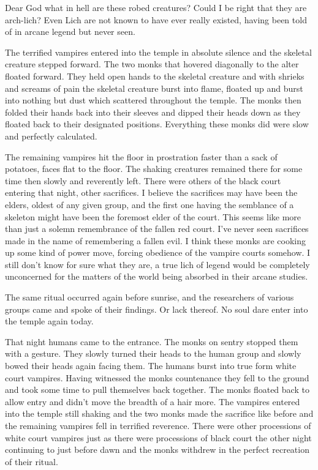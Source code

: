 Dear God what in hell are these robed creatures? Could I be right that they are arch-lich? Even Lich are not known to have ever really existed, having been told of in arcane legend but never seen.

The terrified vampires entered into the temple in absolute silence and the skeletal creature stepped forward. The two monks that hovered diagonally to the alter floated forward. They held open hands to the skeletal creature and with shrieks and screams of pain the skeletal creature burst into flame, floated up and burst into nothing but dust which scattered throughout the temple. The monks then folded their hands back into their sleeves and dipped their heads down as they floated back to their designated positions. Everything these monks did were slow and perfectly calculated.

The remaining vampires hit the floor in prostration faster than a sack of potatoes, faces flat to the floor. The shaking creatures remained there for some time then slowly and reverently left. There were others of the black court entering that night, other sacrifices. I believe the sacrifices may have been the elders, oldest of any given group, and the first one having the semblance of a skeleton might have been the foremost elder of the court. This seems like more than just a solemn remembrance of the fallen red court. I've never seen sacrifices made in the name of remembering a fallen evil. I think these monks are cooking up some kind of power move, forcing obedience of the vampire courts somehow. I still don't know for sure what they are, a true lich of legend would be completely unconcerned for the matters of the world being absorbed in their arcane studies.


The same ritual occurred again before sunrise, and the researchers of various groups came and spoke of their findings. Or lack thereof. No soul dare enter into the temple again today. 


That night humans came to the entrance. The monks on sentry stopped them with a gesture. They slowly turned their heads to the human group and slowly bowed their heads again facing them. The humans burst into true form white court vampires. Having witnessed the monks countenance they fell to the ground and took some time to pull themselves back together. The monks floated back to allow entry and didn't move the breadth of a hair more. The vampires entered into the temple still shaking and the two monks made the sacrifice like before and the remaining vampires fell in terrified reverence. There were other processions of white court vampires just as there were processions of black court the other night continuing to just before dawn and the monks withdrew in the perfect recreation of their ritual.

